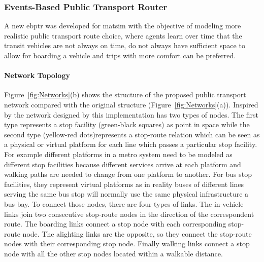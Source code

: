 \subsubsection{Events-Based Public Transport Router} 
\label{sec:RouterStructure}
A new \gls{ebptr} was developed for \gls{matsim} with the objective of modeling more realistic public transport route choice, where agents learn over time that the transit vehicles are not always on time, do not always have sufficient space to allow for boarding a vehicle and trips with more comfort can be preferred.

\paragraph{Network Topology}

Figure~\ref{fig:Networks}(b) shows the structure of the proposed public transport network compared with the original structure (Figure~\ref{fig:Networks}(a)). Inspired by the network designed by \citet{SpiessFlorian_TransResB_1989} this implementation has two types of nodes. The first type represents a stop facility (green-black squares) as point in space while the second type (yellow-red dots)represents a stop-route relation which can be seen as a physical or virtual platform for each line which passes a particular stop facility. For example different platforms in a metro system need to be modeled as different stop facilities because different services arrive at each platform and walking paths are needed to change from one platform to another. For bus stop facilities, they represent virtual platforms as in reality buses of different lines serving the same bus stop will normally use the same physical infrastructure \eg a bus bay. To connect those nodes, there are four types of links. The in-vehicle links join two consecutive stop-route nodes in the direction of the correspondent route. The boarding links connect a stop node with each corresponding stop-route node. The alighting links are the opposite, so they connect the stop-route nodes with their corresponding stop node. Finally walking links connect a stop node with all the other stop nodes located within a walkable distance.

